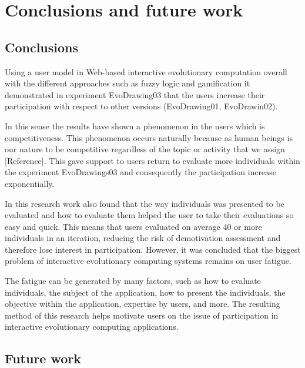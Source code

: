 \chapter{Conclusions and future work} \label{sec:5}

\section{Conclusions}

Using a user model in Web-based interactive evolutionary computation  overall with the different approaches such as fuzzy logic and gamification it demonstrated  in experiment EvoDrawing03 that the users increase their participation with respect to other versions (EvoDrawing01, EvoDrawin02).

In this sense the results have shown a phenomenon in the users which is competitiveness. This phenomenon occurs naturally because as human beings is our nature to be competitive regardless of the topic or activity that we assign [Reference]. This gave support to users return to evaluate more individuals within the experiment EvoDrawings03 and consequently the participation increase exponentially. 

In this research work also found that the way individuals was presented to be evaluated and how to evaluate them helped the user to take their evaluations so easy and quick. This means that users evaluated on average 40 or more individuals in an iteration, reducing the risk of demotivation assessment and therefore lose interest in participation. However, it was concluded that the biggest problem of interactive evolutionary computing systems remains on user fatigue.

The fatigue can be generated by many factors, such as how to evaluate individuals, the subject of the application, how to present the individuals, the objective within the application, expertise by users, and more. The resulting method of this research helps motivate users on the issue of participation in interactive evolutionary computing applications.


\section{Future work}

